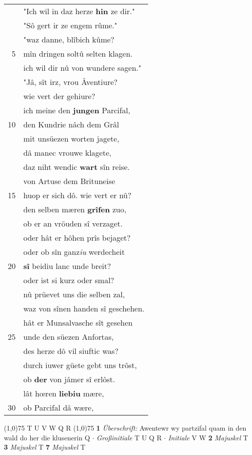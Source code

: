 \documentclass[8pt,a4paper,notitlepage]{article}
\begin{document}
\begin{table}[ht]
\begin{minipage}[t]{0.5\linewidth}
\begin{tabular}{rl}
 & "Ich wil in daz herze \textbf{hin} ze dir."\\ 
 & "Sô gert ir ze engem rûme."\\ 
 & "waz danne, blîbich kûme?\\ 
5 & mîn dringen soltû selten klagen.\\ 
 & ich wil dir nû von wundere sagen."\\ 
 & "Jâ, sît irz, vrou Âventiure?\\ 
 & wie vert der gehiure?\\ 
 & ich meine den \textbf{jungen} Parcifal,\\ 
10 & den Kundrie nâch dem Grâl\\ 
 & mit unsüezen worten jagete,\\ 
 & dâ manec vrouwe klagete,\\ 
 & daz niht wendic \textbf{wart} sîn reise.\\ 
 & von Artuse dem Brituneise\\ 
15 & huop er sich dô. wie vert er nû?\\ 
 & den selben mæren \textbf{grîfen} zuo,\\ 
 & ob er an vröuden sî verzaget.\\ 
 & oder hât er hôhen prîs bejaget?\\ 
 & oder ob sîn ganz\textit{iu} werdecheit\\ 
20 & \textbf{sî} beidiu lanc unde breit?\\ 
 & oder ist si kurz oder smal?\\ 
 & nû prüevet uns die selben zal,\\ 
 & waz von sînen handen sî geschehen.\\ 
 & hât er Munsalvasche sît gesehen\\ 
25 & unde den süezen Anfortas,\\ 
 & des herze dô vil siuftic was?\\ 
 & durch iuwer güete gebt uns trôst,\\ 
 & ob \textbf{der} von jâmer sî erlôst.\\ 
 & lât hœren \textbf{liebiu} mære,\\ 
30 & ob Parcifal  dâ wære,\\ 
\end{tabular}
\scriptsize
\line(1,0){75} \newline
T U V W Q R \newline
\line(1,0){75} \newline
\textbf{1} \textit{Überschrift:} Awentewr wy partzifal quam in den wald do her die klusenerin Q   $\cdot$ \textit{Großinitiale} T U Q R   $\cdot$ \textit{Initiale} V W  \textbf{2} \textit{Majuskel} T  \textbf{3} \textit{Majuskel} T  \textbf{7} \textit{Majuskel} T  \newline

\end{minipage}
\end{table}
\end{document}
